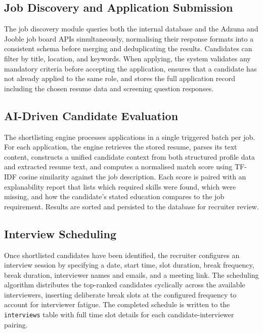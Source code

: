 \documentclass[12pt,a4paper]{report}
\begin{document}
\subsection{Job Discovery and Application Submission}

The job discovery module queries both the internal database and the Adzuna and Jooble job board APIs simultaneously, normalising their response formats into a consistent schema before merging and deduplicating the results. Candidates can filter by title, location, and keywords. When applying, the system validates any mandatory criteria before accepting the application, ensures that a candidate has not already applied to the same role, and stores the full application record including the chosen resume data and screening question responses.

\subsection{AI-Driven Candidate Evaluation}

The shortlisting engine processes applications in a single triggered batch per job. For each application, the engine retrieves the stored resume, parses its text content, constructs a unified candidate context from both structured profile data and extracted resume text, and computes a normalised match score using TF-IDF cosine similarity against the job description. Each score is paired with an explanability report that lists which required skills were found, which were missing, and how the candidate's stated education compares to the job requirement. Results are sorted and persisted to the database for recruiter review.

\subsection{Interview Scheduling}

Once shortlisted candidates have been identified, the recruiter configures an interview session by specifying a date, start time, slot duration, break frequency, break duration, interviewer names and emails, and a meeting link. The scheduling algorithm distributes the top-ranked candidates cyclically across the available interviewers, inserting deliberate break slots at the configured frequency to account for interviewer fatigue. The completed schedule is written to the \texttt{interviews} table with full time slot details for each candidate-interviewer pairing.
\end{document}
